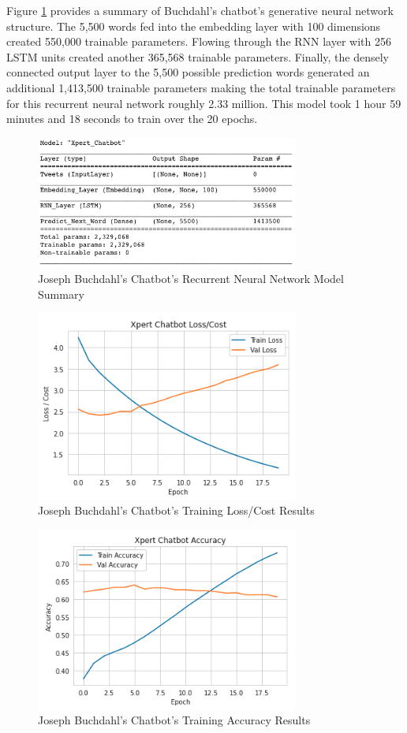 \documentclass[5p,authoryear]{elsarticle}
\begin{document}
Figure \ref{Xpert Summary} provides a summary of Buchdahl’s chatbot’s generative neural network structure. The 5,500 words fed into the embedding layer with 100 dimensions created 550,000 trainable parameters. Flowing through the RNN layer with 256 LSTM units created another 365,568 trainable parameters. Finally, the densely connected output layer to the 5,500 possible prediction words generated an additional 1,413,500 trainable parameters making the total trainable parameters for this recurrent neural network roughly 2.33 million. This model took 1 hour 59 minutes and 18 seconds to train over the 20 epochs.


\begin{figure}[!htb] \centering
	\includegraphics[width=3.4in]{figures/Xpert_Model.png}
	\caption[]{Joseph Buchdahl’s Chatbot’s Recurrent Neural Network Model Summary} 
	\label{Xpert Summary} 
\end{figure}


\begin{figure}[!htb] \centering
	\includegraphics[width=3.4in]{figures/Xpert_Loss.png}
	\caption[]{Joseph Buchdahl’s Chatbot’s Training Loss/Cost Results} 
	\label{Xpert Loss} 
\end{figure}

\begin{figure}[!htb] \centering
	\includegraphics[width=3.4in]{figures/Xpert_Acc.png}
	\caption[]{Joseph Buchdahl’s Chatbot’s Training Accuracy Results} 
	\label{Xpert Acc} 
\end{figure}
\end{document}
